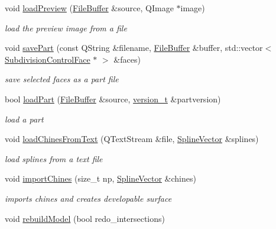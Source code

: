 \begin{DoxyCompactItemize}
\item 
void \hyperlink{classShipCAD_1_1ShipCADModel_a6be8a5765b6b9ee5b5dc0397bdd43be5}{load\+Preview} (\hyperlink{classShipCAD_1_1FileBuffer}{File\+Buffer} \&source, Q\+Image $\ast$image)
\begin{DoxyCompactList}\small\item\em load the preview image from a file \end{DoxyCompactList}\item 
void \hyperlink{classShipCAD_1_1ShipCADModel_a0d969a8b0f05767d6507290f118d769c}{save\+Part} (const Q\+String \&filename, \hyperlink{classShipCAD_1_1FileBuffer}{File\+Buffer} \&buffer, std\+::vector$<$ \hyperlink{classShipCAD_1_1SubdivisionControlFace}{Subdivision\+Control\+Face} $\ast$ $>$ \&faces)
\begin{DoxyCompactList}\small\item\em save selected faces as a part file \end{DoxyCompactList}\item 
bool \hyperlink{classShipCAD_1_1ShipCADModel_a167bdeeb8995f102acdbb8cdb92f34e3}{load\+Part} (\hyperlink{classShipCAD_1_1FileBuffer}{File\+Buffer} \&source, \hyperlink{namespaceShipCAD_af3a6fa23a7318acbda7b0066b53d694f}{version\+\_\+t} \&partversion)
\begin{DoxyCompactList}\small\item\em load a part \end{DoxyCompactList}\item 
void \hyperlink{classShipCAD_1_1ShipCADModel_ae03a368cf40f1781fb0ed8a60248dcc6}{load\+Chines\+From\+Text} (Q\+Text\+Stream \&file, \hyperlink{namespaceShipCAD_a053b941b2c87049bb9380428d4d5a056}{Spline\+Vector} \&splines)
\begin{DoxyCompactList}\small\item\em load splines from a text file \end{DoxyCompactList}\item 
void \hyperlink{classShipCAD_1_1ShipCADModel_a860a91c09307c71f738a75aec159e6d0}{import\+Chines} (size\+\_\+t np, \hyperlink{namespaceShipCAD_a053b941b2c87049bb9380428d4d5a056}{Spline\+Vector} \&chines)
\begin{DoxyCompactList}\small\item\em imports chines and creates developable surface \end{DoxyCompactList}\item 
void \hyperlink{classShipCAD_1_1ShipCADModel_a1b27573aab3a458f9002a7e4e327736a}{rebuild\+Model} (bool redo\+\_\+intersections)

\end{DoxyCompactItemize}

